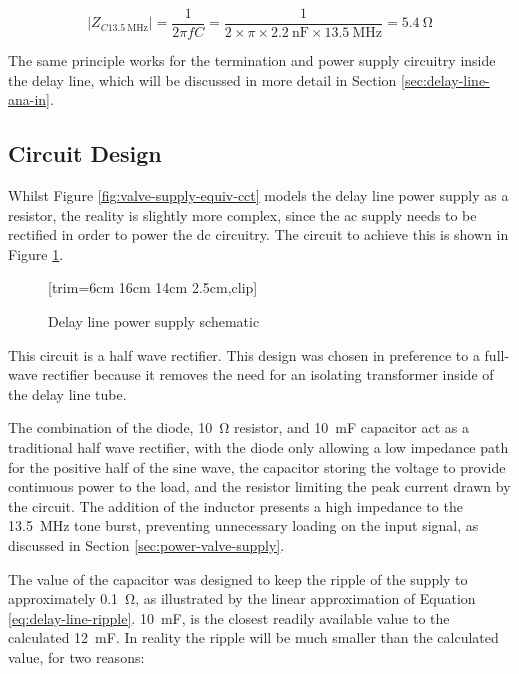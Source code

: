 \begin{equation}
| Z_{C\SI{13.5}{\mega\hertz}} | = \frac{1}{2 \pi f C} = \frac{1}{2 \times \pi \times \SI{2.2}{\nano\farad} \times \SI{13.5}{\mega\hertz}} = \SI{5.4}{\ohm} \label{eq:pulse-c-impedance} 
\end{equation}

The same principle works for the termination and power supply circuitry inside the delay line, which will be discussed in more detail in Section \ref{sec:delay-line-ana-in}.

\subsection{Circuit Design} \label{sec:power-circuit}

Whilst Figure \ref{fig:valve-supply-equiv-cct} models the delay line power supply as a resistor, the reality is slightly more complex, since the \gls{ac} supply needs to be rectified in order to power the \gls{dc} circuitry. The circuit to achieve this is shown in Figure \ref{fig:delay-line-psu-sch}.

\begin{figure}[ht]
	\centering
	[trim={6cm 16cm 14cm 2.5cm},clip] %
	\caption{Delay line power supply schematic}
	\label{fig:delay-line-psu-sch}
\end{figure}

This circuit is a half wave rectifier. This design was chosen in preference to a full-wave rectifier because it removes the need for an isolating transformer inside of the delay line tube.

The combination of the diode, \SI{10}{\ohm} resistor, and \SI{10}{\milli\farad} capacitor act as a traditional half wave rectifier, with the diode only allowing a low impedance path for the positive half of the sine wave, the capacitor storing the voltage to provide continuous power to the load, and the resistor limiting the peak current drawn by the circuit. The addition of the inductor presents a high impedance to the \SI{13.5}{\mega\hertz} tone burst, preventing unnecessary loading on the input signal, as discussed in Section \ref{sec:power-valve-supply}.

The value of the capacitor was designed to keep the ripple of the supply to approximately \SI{0.1}{\ohm}, as illustrated by the linear approximation of Equation \ref{eq:delay-line-ripple}. \SI{10}{\milli\farad}, is the closest readily available value to the calculated \SI{12}{\milli\farad}. In reality the ripple will be much smaller than the calculated value, for two reasons:

